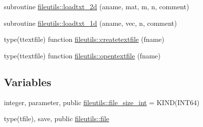 \begin{DoxyCompactItemize}
\item 
subroutine \mbox{\hyperlink{namespacefileutils_aefd4b6f83e21fff9ab97894279daaecb}{fileutils\+::loadtxt\+\_\+2d}} (aname, mat, m, n, comment)
\item 
subroutine \mbox{\hyperlink{namespacefileutils_ac5c5aa9cef807fcc118234407f98b422}{fileutils\+::loadtxt\+\_\+1d}} (aname, vec, n, comment)
\item 
type(ttextfile) function \mbox{\hyperlink{namespacefileutils_a64381cf183dd4f3ab198ebe7d87b1745}{fileutils\+::createtextfile}} (fname)
\item 
type(ttextfile) function \mbox{\hyperlink{namespacefileutils_a12160238f4fcdecaed130c680db7405a}{fileutils\+::opentextfile}} (fname)
\end{DoxyCompactItemize}
\subsection*{Variables}
\begin{DoxyCompactItemize}
\item 
integer, parameter, public \mbox{\hyperlink{namespacefileutils_a334ae57c14956bd4597df7a130f6e8a8}{fileutils\+::file\+\_\+size\+\_\+int}} = K\+I\+ND(I\+N\+T64)
\item 
type(tfile), save, public \mbox{\hyperlink{namespacefileutils_a7a95a2141243385ca3ee3909016380ab}{fileutils\+::file}}
\end{DoxyCompactItemize}
